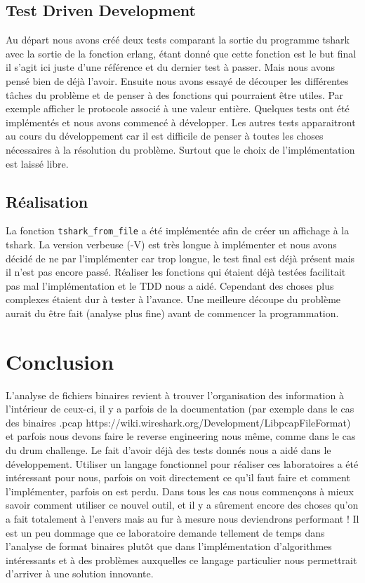 \documentclass[10pt,a4paper]{article}
\begin{document}
\subsection{Test Driven Development}
Au départ nous avons créé deux tests comparant la sortie du programme tshark avec la sortie de la fonction erlang, étant donné que cette fonction est le but final il s'agit ici juste d'une référence et du dernier test à passer. Mais nous avons pensé bien de déjà l'avoir. Ensuite nous avons essayé de découper les différentes tâches du problème et de penser à des fonctions qui pourraient être utiles. Par exemple afficher le protocole associé à une valeur entière. Quelques tests ont été implémentés et nous avons commencé à développer. Les autres tests apparaitront au cours du développement car il est difficile de penser à toutes les choses nécessaires à la résolution du problème. Surtout que le choix de l'implémentation est laissé libre.

\subsection{Réalisation}
La fonction \texttt{tshark\_from\_file} a été implémentée afin de créer un affichage à la tshark. La version verbeuse (-V) est très longue à implémenter et nous avons décidé de ne par l'implémenter car trop longue, le test final est déjà présent mais il n'est pas encore passé. Réaliser les fonctions qui étaient déjà testées facilitait pas mal l'implémentation et le TDD nous a aidé. Cependant des choses plus complexes étaient dur à tester à l'avance. Une meilleure découpe du problème aurait du être fait (analyse plus fine) avant de commencer la programmation.

\section{Conclusion}
L'analyse de fichiers binaires revient à trouver l'organisation des information à l'intérieur de ceux-ci, il y a parfois de la documentation (par exemple dans le cas des binaires .pcap https://wiki.wireshark.org/Development/LibpcapFileFormat) 	et parfois nous devons faire le reverse engineering nous même, comme dans le cas du drum challenge.
Le fait d'avoir déjà des tests donnés nous a aidé dans le développement. Utiliser un langage fonctionnel pour réaliser ces laboratoires a été intéressant pour nous, parfois on voit directement ce qu'il faut faire et comment l'implémenter, parfois on est perdu. Dans tous les cas nous commençons à mieux savoir comment utiliser ce nouvel outil, et il y a sûrement encore des choses qu'on a fait totalement à l'envers mais au fur à mesure nous deviendrons performant ! Il est un peu dommage que ce laboratoire demande tellement de temps dans l'analyse de format binaires plutôt que dans l'implémentation d'algorithmes intéressants et à des problèmes auxquelles ce langage particulier nous permettrait d'arriver à une solution innovante.
\end{document}
